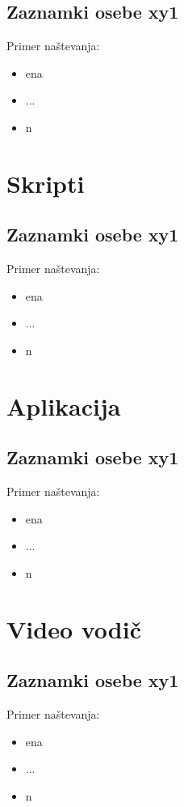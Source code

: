 \subsection{Zaznamki osebe xy1}
Primer naštevanja:
\begin{itemize}
	\item ena
	\item ...
	\item n	
\end{itemize}

\section{Skripti}
\subsection{Zaznamki osebe xy1}
Primer naštevanja:
\begin{itemize}
	\item ena
	\item ...
	\item n	
\end{itemize}

\section{Aplikacija}
\subsection{Zaznamki osebe xy1}
Primer naštevanja:
\begin{itemize}
	\item ena
	\item ...
	\item n	
\end{itemize}

\section{Video vodič}
\subsection{Zaznamki osebe xy1}
Primer naštevanja:
\begin{itemize}
	\item ena
	\item ...
	\item n	
\end{itemize}